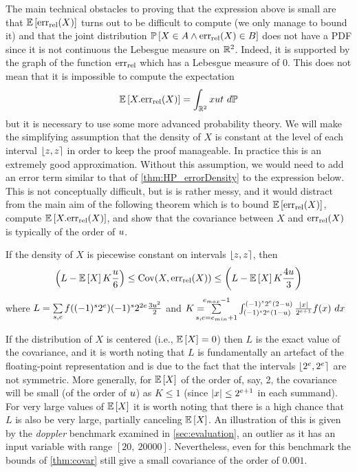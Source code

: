 The main technical obstacles to proving that the expression above is small are that $\mathbb{E}\left[\mathrm{err}_{\mathrm{rel}}(X)\right]$ turns out to be difficult to compute (we only manage to bound it) and that the joint distribution
$\mathbb{P}\left[ X\in A \wedge \mathrm{err}_{\mathrm{rel}}(X) \in B \right]$
does not have a PDF since it is not continuous \wrt the Lebesgue measure on $\mathbb{R}^2$. Indeed, it is supported by the graph of the function $\mathrm{err}_{\mathrm{rel}}$ which has a Lebesgue measure of 0. This does not mean that it is impossible to compute the expectation
\begin{align}
\mathbb{E}\left[X.\mathrm{err}_{\mathrm{rel}}(X)\right] = \int_{\mathbb{R}^2} xu t ~d\mathbb{P}\label{eq:expdef}
\end{align}
but it is necessary to use some more advanced probability theory.  We will make the simplifying assumption that the density of $X$ is constant at the level of each interval $\fintvl$ in order to keep the proof manageable.  In practice this is an extremely good approximation. Without this assumption, we would need to add an error term similar to that of \cref{thm:HP_errorDensity} to the expression below. This is not conceptually difficult, but is is rather messy, and it would distract from the main aim of the following theorem which is to bound $\mathbb{E}\left[\mathrm{err}_{\mathrm{rel}}(X)\right]$, compute $\mathbb{E}\left[X.\mathrm{err}_{\mathrm{rel}}(X)\right]$, and show that the covariance between $X$ and $\mathrm{err}_{\mathrm{rel}}(X)$ is typically of the order of $u$.
\begin{theorem}\label{thm:covar}
If the density of $X$ is piecewise constant on intervals $\fintvl$,  then
\[
\left(L -  \mathbb{E}\left[X\right]K\frac{u}{6}\right) \leq \mathrm{Cov}(X,\mathrm{err}_{\mathrm{rel}}(X))\leq \left(L -  \mathbb{E}\left[X\right]K\frac{4u}{3}\right)
\]
where $L=\sum\limits_{s,e} f((-1)^s2^e)(-1)^s2^{2e}\frac{3u^2}{2}$ and $K=\hspace{-12pt} \sum\limits_{s,e=\emin+1}^{\emax-1}\int_{(-1)^s2^e(1-\uro)}^{(-1)^s2^e(2-u)} \frac{\absv{x}}{2^{e+1}} f(x) ~dx$
\end{theorem} 
If the distribution of $X$ is centered (i.e., $\mathbb{E}\left[X\right]=0$) then $L$ is the exact value of the covariance, and it is worth noting that $L$ is fundamentally an artefact of the floating-point representation and is due to the fact that the intervals $\fintvl[2^e]$ are not symmetric. More generally, for $\mathbb{E}\left[X\right]$ of the order of, say, 2, the covariance will be small (of the order of $u$) as $K\leq 1$ (since $\left\lvert x\right\rvert\leq 2^{e+1}$ in each summand).  For very large values of $\mathbb{E}\left[X\right]$ it is worth noting that there is a high chance that $L$ is also be very large, partially canceling $\mathbb{E}\left[X\right]$. An illustration of this is given by the \textit{doppler} benchmark examined in \cref{sec:evaluation}, an outlier as it has an input variable with range $\left[20,~20000\right]$. Nevertheless,  even for this benchmark the bounds of \cref{thm:covar} still give a small covariance of the order of $0.001$.

